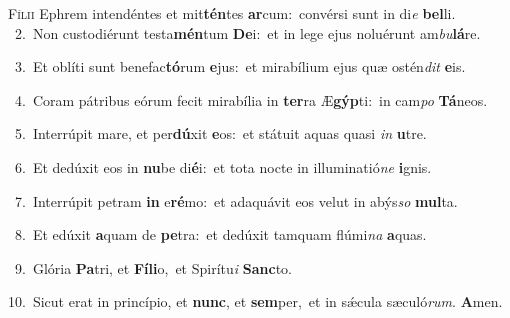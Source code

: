 \lettrine{\initial\textcolor{\initialcolor}{F}}{ílii} Ephrem intendéntes et mit\-\textbf{tén}\-tes \textbf{ar}\-cum:~\star convérsi sunt in di\textit{e} \textbf{bel}\-li.\\
{\numbfont\textcolor{\numbcolor}{~2.}}~Non custodiérunt testa\-\textbf{mén}\-tum \textbf{De}\-i:~\star et in lege ejus noluérunt am\-\textit{bu}\-\textbf{lá}re.\par
{\numbfont\textcolor{\numbcolor}{~3.}}~Et oblíti sunt benefac\-\textbf{tó}\-rum \textbf{e}\-jus:~\star et mirabílium ejus quæ ostén\textit{dit} \textbf{e}\-is.\par
{\numbfont\textcolor{\numbcolor}{~4.}}~Coram pátribus eórum fecit mirabília in \textbf{ter}\-ra Æ\-\textbf{gýp}\-ti:~\star in cam\textit{po} \textbf{Tá}\-neos.\par
{\numbfont\textcolor{\numbcolor}{~5.}}~Interrúpit mare, et per\-\textbf{dú}\-xit \textbf{e}\-os:~\star et státuit aquas quasi \textit{in} \textbf{u}\-tre.\par
{\numbfont\textcolor{\numbcolor}{~6.}}~Et dedúxit eos in \textbf{nu}\-be di\-\textbf{é}\-i:~\star et tota nocte in illuminatió\textit{ne} \textbf{i}\-gnis.\par
{\numbfont\textcolor{\numbcolor}{~7.}}~Interrúpit petram \textbf{in} e\-\textbf{ré}\-mo:~\star et adaquávit eos velut in abýs\textit{so} \textbf{mul}\-ta.\par
{\numbfont\textcolor{\numbcolor}{~8.}}~Et edúxit \textbf{a}\-quam de \textbf{pe}\-tra:~\star et dedúxit tamquam flúmi\textit{na} \textbf{a}\-quas.\par
{\numbfont\textcolor{\numbcolor}{~9.}}~Glória \textbf{Pa}\-tri, et \textbf{Fí}\-\textbf{li}o,~\star et Spirítu\textit{i} \textbf{Sanc}\-to.\par
{\numbfont\textcolor{\numbcolor}{10.}}~Sicut erat in princípio, et \textbf{nunc}\-, et \textbf{sem}\-per,~\star et in sǽcula sæculó\-\textit{rum}\-. \textbf{A}\-men.\par
